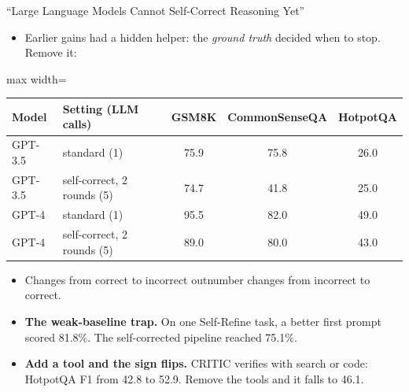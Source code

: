 \begin{frame}{``Large Language Models Cannot Self-Correct Reasoning Yet''}
    \begin{itemize}\itemsep0.3em
        \item Earlier gains had a hidden helper: the \emph{ground truth} decided when to stop. Remove it:
    \end{itemize}
    \begin{center}
    \small
    \begin{adjustbox}{max width=\linewidth}\begin{tabular}{llccc}
        \toprule
        \textbf{Model} & \textbf{Setting (LLM calls)} & \textbf{GSM8K} & \textbf{CommonSenseQA} & \textbf{HotpotQA} \\
        \midrule
        GPT-3.5 & standard (1) & 75.9 & 75.8 & 26.0 \\
        GPT-3.5 & self-correct, 2 rounds (5) & 74.7 & \alert{41.8} & 25.0 \\
        GPT-4 & standard (1) & 95.5 & 82.0 & 49.0 \\
        GPT-4 & self-correct, 2 rounds (5) & \alert{89.0} & 80.0 & 43.0 \\
        \bottomrule
    \end{tabular}\end{adjustbox}
    \end{center}
    \begin{itemize}\itemsep0.2em
        \item Changes from correct to incorrect outnumber changes from incorrect to correct.
        \item \textbf{The weak-baseline trap.} On one Self-Refine task, a better first prompt scored 81.8\%. The self-corrected pipeline reached 75.1\%.
        \item \textbf{Add a tool and the sign flips.} CRITIC verifies with search or code: HotpotQA F1 from 42.8 to 52.9. Remove the tools and it falls to 46.1.
    \end{itemize}
\end{frame}


